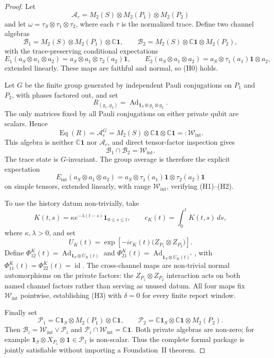 \documentclass[12pt]{article}
\theoremstyle{definition}
\theoremstyle{remark}
\newcommand{\Ac}{\mathcal A_c}
\newcommand{\Wint}{\mathcal W_{\mathrm{int}}}
\begin{document}
\begin{proof}
Let
\[
\Ac=M_2(S)\otimes M_2(P_1)\otimes M_2(P_2)
\]
and let \(\omega=\tau_S\otimes\tau_1\otimes\tau_2\), where each
\(\tau\) is the normalized trace. Define two channel algebras
\[
\mathcal B_1=M_2(S)\otimes M_2(P_1)\otimes\mathbb C\mathbf1,
\qquad
\mathcal B_2=M_2(S)\otimes\mathbb C\mathbf1\otimes M_2(P_2),
\]
with the trace-preserving conditional expectations
\[
E_1(a_S\otimes a_1\otimes a_2)
=a_S\otimes a_1\otimes\tau_2(a_2)\mathbf1,
\qquad
E_2(a_S\otimes a_1\otimes a_2)
=a_S\otimes\tau_1(a_1)\mathbf1\otimes a_2,
\]
extended linearly.
These maps are faithful and normal, so (H0) holds.

Let \(G\) be the finite group generated by independent Pauli
conjugations on \(P_1\) and \(P_2\), with phases factored out, and set
\[
R_{(g_1,g_2)}
=
\operatorname{Ad}_{\mathbf1_S\otimes g_1\otimes g_2}.
\]
The only matrices fixed by all Pauli conjugations on either private
qubit are scalars. Hence
\[
\operatorname{Eq}(R)=\Ac^G
=M_2(S)\otimes\mathbb C\mathbf1\otimes\mathbb C\mathbf1
=:\Wint.
\]
This algebra is neither \(\mathbb C\mathbf1\) nor \(\Ac\), and direct
tensor-factor inspection gives
\[
\mathcal B_1\cap\mathcal B_2=\Wint.
\]
The trace state is \(G\)-invariant. The group average is therefore the
explicit expectation
\[
E_{\mathrm{int}}(a_S\otimes a_1\otimes a_2)
=a_S\otimes\tau_1(a_1)\mathbf1\otimes\tau_2(a_2)\mathbf1
\]
on simple tensors, extended linearly, with range \(\Wint\), verifying
(H1)--(H2).

To use the history datum non-trivially, take
\[
K(t,s)=\kappa e^{-\lambda(t-s)}\mathbf1_{0\leq s\leq t},
\qquad
c_K(t)=\int_0^t K(t,s)\,ds,
\]
where \(\kappa,\lambda>0\), and set
\[
U_K(t)=\exp\!\left[-i c_K(t)
\bigl(Z_{P_1}\otimes Z_{P_2}\bigr)\right].
\]
Define \(\Phi_{12}^{K}(t)=\operatorname{Ad}_{\mathbf1_S\otimes U_K(t)}\)
and \(\Phi_{21}^{K}(t)=\operatorname{Ad}_{\mathbf1_S\otimes U_K(t)^*}\),
with \(\Phi_{11}^{K}(t)=\Phi_{22}^{K}(t)=\operatorname{id}\).
The cross-channel maps are non-trivial normal automorphisms on the
private factors: the \(Z_{P_1}\otimes Z_{P_2}\) interaction acts on both
named channel factors rather than serving as unused datum. All four maps
fix \(\Wint\) pointwise, establishing (H3) with \(\delta=0\) for every
finite report window.

Finally set
\[
\mathcal P_1=\mathbb C\mathbf1_S\otimes M_2(P_1)
\otimes\mathbb C\mathbf1,
\qquad
\mathcal P_2=\mathbb C\mathbf1_S\otimes\mathbb C\mathbf1
\otimes M_2(P_2).
\]
Then \(\mathcal B_i=\Wint\vee\mathcal P_i\) and
\(\mathcal P_i\cap\Wint=\mathbb C\mathbf1\). Both private algebras are
non-zero; for example
\(\mathbf1_S\otimes X_{P_1}\otimes\mathbf1\in\mathcal P_1\) is
non-scalar. Thus the complete formal package is jointly satisfiable
without importing a Foundation~II theorem.
\end{proof}
\end{document}
